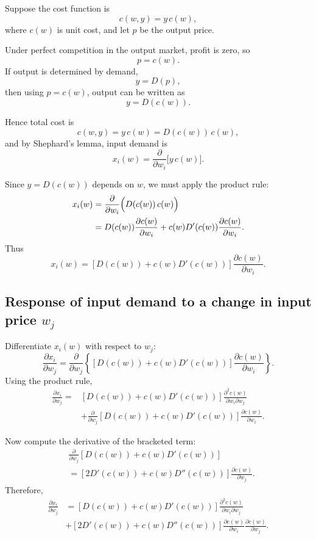 Suppose the cost function is
\[
c(w,y)=y\,c(w),
\]
where \(c(w)\) is unit cost, and let \(p\) be the output price.

Under perfect competition in the output market, profit is zero, so
\[
p=c(w).
\]
If output is determined by demand,
\[
y=D(p),
\]
then using \(p=c(w)\), output can be written as
\[
y=D(c(w)).
\]

Hence total cost is
\[
c(w,y)=y\,c(w)=D(c(w))\,c(w),
\]
and by Shephard's lemma, input demand is
\[
x_i(w)=\frac{\partial}{\partial w_i}\bigl[y\,c(w)\bigr].
\]

Since \(y=D(c(w))\) depends on \(w\), we must apply the product rule:
\[
\begin{aligned}
x_i(w)
&=
\frac{\partial}{\partial w_i}\Bigl(D(c(w))\,c(w)\Bigr)\\
&=
D(c(w))\frac{\partial c(w)}{\partial w_i}
+
c(w)D'(c(w))\frac{\partial c(w)}{\partial w_i}.
\end{aligned}
\]
Thus
\[
x_i(w)
=
\left[D(c(w))+c(w)D'(c(w))\right]\frac{\partial c(w)}{\partial w_i}.
\]

\subsection*{Response of input demand to a change in input price \(w_j\)}

Differentiate \(x_i(w)\) with respect to \(w_j\):
\[
\frac{\partial x_i}{\partial w_j}
=
\frac{\partial}{\partial w_j}
\left\{
\left[D(c(w))+c(w)D'(c(w))\right]\frac{\partial c(w)}{\partial w_i}
\right\}.
\]
Using the product rule,
\[
\begin{aligned}
\frac{\partial x_i}{\partial w_j}
=
&\left[D(c(w))+c(w)D'(c(w))\right]\frac{\partial^2 c(w)}{\partial w_i\partial w_j}\\
&+
\frac{\partial}{\partial w_j}\left[D(c(w))+c(w)D'(c(w))\right]\frac{\partial c(w)}{\partial w_i}.
\end{aligned}
\]

Now compute the derivative of the bracketed term:
\[
\begin{aligned}
&\frac{\partial}{\partial w_j}\left[D(c(w))+c(w)D'(c(w))\right]\\
&=
\left[2D'(c(w))+c(w)D''(c(w))\right]\frac{\partial c(w)}{\partial w_j}.
\end{aligned}
\]
Therefore,
\[
\boxed{
\begin{aligned}
\frac{\partial x_i}{\partial w_j}
&=
\left[D(c(w))+c(w)D'(c(w))\right]\frac{\partial^2 c(w)}{\partial w_i\partial w_j}\\
&+
\left[2D'(c(w))+c(w)D''(c(w))\right]
\frac{\partial c(w)}{\partial w_i}
\frac{\partial c(w)}{\partial w_j}.
\end{aligned}
}
\]

